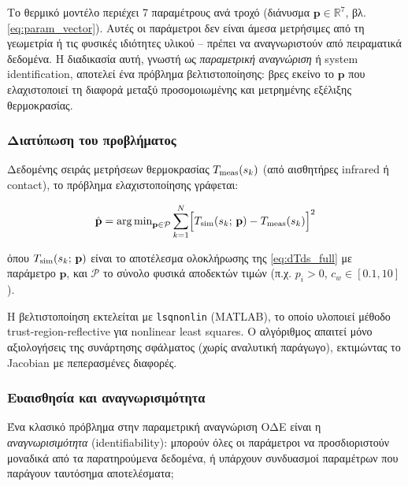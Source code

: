 
\label{subsec:parameter_id}

Το θερμικό μοντέλο περιέχει 7 παραμέτρους ανά τροχό (διάνυσμα $\mathbf{p} \in
\mathbb{R}^7$, βλ. \cref{eq:param_vector}). Αυτές οι παράμετροι δεν είναι άμεσα μετρήσιμες
από τη γεωμετρία ή τις φυσικές ιδιότητες υλικού -- πρέπει να αναγνωριστούν από πειραματικά
δεδομένα. Η διαδικασία αυτή, γνωστή ως \emph{παραμετρική αναγνώριση} ή system
identification, αποτελεί ένα πρόβλημα βελτιστοποίησης: βρες εκείνο το $\mathbf{p}$ που
ελαχιστοποιεί τη διαφορά μεταξύ προσομοιωμένης και μετρημένης εξέλιξης θερμοκρασίας.

\subsubsection{Διατύπωση του προβλήματος}

Δεδομένης σειράς μετρήσεων θερμοκρασίας $T_{\rm meas}(s_k)$ (από αισθητήρες infrared ή
contact), το πρόβλημα ελαχιστοποίησης γράφεται:

\begin{equation}
    \hat{\mathbf{p}} = \operatorname{arg\,min}_{\mathbf{p} \in \mathcal{P}} \sum_{k=1}^{N}
    \Bigl[ T_{\rm sim}(s_k;\,\mathbf{p}) - T_{\rm meas}(s_k) \Bigr]^2
    \label{eq:param_id_obj}
\end{equation}

όπου $T_{\rm sim}(s_k;\,\mathbf{p})$ είναι το αποτέλεσμα ολοκλήρωσης της
\cref{eq:dTds_full} με παράμετρο $\mathbf{p}$, και $\mathcal{P}$ το σύνολο φυσικά
αποδεκτών τιμών (π.χ. $p_i > 0$, $c_w \in [0.1, 10]$).

Η βελτιστοποίηση εκτελείται με \texttt{lsqnonlin} (MATLAB), το οποίο υλοποιεί μέθοδο
trust-region-reflective για nonlinear least squares. Ο αλγόριθμος απαιτεί μόνο
αξιολογήσεις της συνάρτησης σφάλματος (χωρίς αναλυτική παράγωγο), εκτιμώντας το Jacobian
με πεπερασμένες διαφορές.

\subsubsection{Ευαισθησία και αναγνωρισιμότητα}

Ένα κλασικό πρόβλημα στην παραμετρική αναγνώριση ΟΔΕ είναι η \emph{αναγνωρισιμότητα}
(identifiability): μπορούν όλες οι παράμετροι να προσδιοριστούν μοναδικά από τα
παρατηρούμενα δεδομένα, ή υπάρχουν συνδυασμοί παραμέτρων που παράγουν ταυτόσημα
αποτελέσματα;

